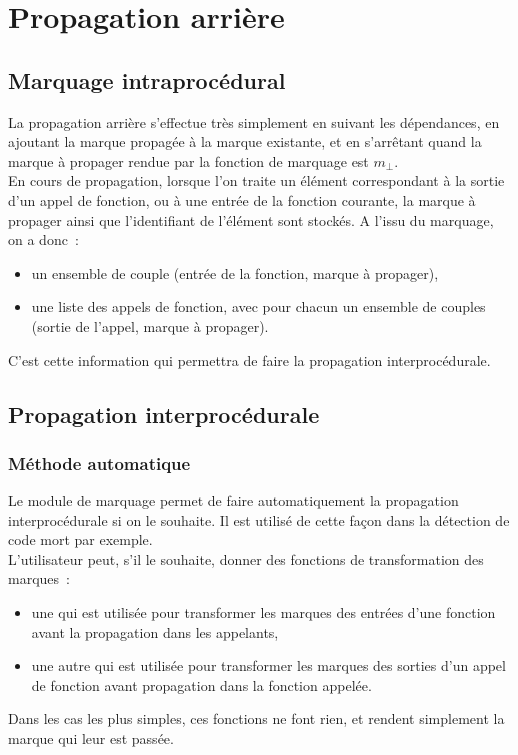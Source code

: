 \section{Propagation arrière}

\subsection{Marquage intraprocédural}

La propagation arrière s'effectue très simplement en suivant les dépendances,
en ajoutant la marque propagée à la marque existante,
et en s'arrêtant quand la marque à propager rendue par la fonction de marquage
est $m_{\bot}$.\\

En cours de propagation, lorsque l'on traite un élément correspondant à la
sortie d'un appel de fonction, ou à une entrée de la fonction courante,
la marque à propager ainsi que l'identifiant de l'élément sont stockés.
A l'issu du marquage, on a donc~:
\begin{itemize}
  \item un ensemble de couple (entrée de la fonction, marque à propager),
  \item une liste des appels de fonction, avec pour chacun un ensemble de
    couples (sortie de l'appel, marque à propager).
\end{itemize}

C'est cette information qui permettra de faire la propagation interprocédurale.

\subsection{Propagation interprocédurale}

\subsubsection{Méthode automatique}

Le module de marquage permet de faire automatiquement
la propagation interprocédurale si on le souhaite.
Il est utilisé de cette façon dans la détection de code mort par exemple.\\

L'utilisateur peut, s'il le souhaite,
donner des fonctions de transformation des marques~:
\begin{itemize}
  \item une qui est utilisée pour transformer les marques des entrées d'une
    fonction avant la propagation dans les appelants,
  \item une autre qui est utilisée pour transformer les marques des sorties
    d'un appel de fonction avant propagation dans la fonction appelée.
\end{itemize}
Dans les cas les plus simples, ces fonctions ne font rien, et rendent
simplement la marque qui leur est passée.

